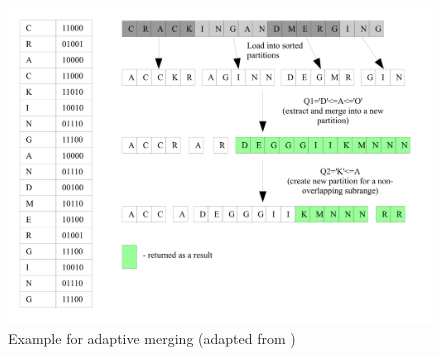 \documentclass[10pt, conference, compsocconf]{IEEEtran}
\begin{document}
\begin{figure}[h]
\centering
\includegraphics[width=\columnwidth]{merging.png}
\caption{Example for adaptive merging (adapted from \cite{merging})}
\end{figure}
\end{document}

